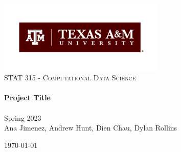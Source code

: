 \begin{titlepage}
    \vbox{ }

    \vbox{ }

    \begin{center}
        \includegraphics[width=0.6\textwidth]{img/TAM-PrimaryMarkA}\\[4cm]
        \textsc{\Large STAT 315 - Computational Data Science}\\[0.7cm]

        \noindent\makebox[\linewidth]{\rule{.7\paperwidth}{.6pt}}\\[0.7cm]
        { \huge \bfseries Project Title}\\[0.25cm]
        \noindent\makebox[\linewidth]{\rule{.7\paperwidth}{.6pt}}\\[0.7cm]
        \large{Spring 2023}\\[1.2cm]
        \vfill
        \large
        Ana Jimenez, Andrew Hunt, Dien Chau, Dylan Rollins

        {\large \today}
    \end{center}
\end{titlepage}